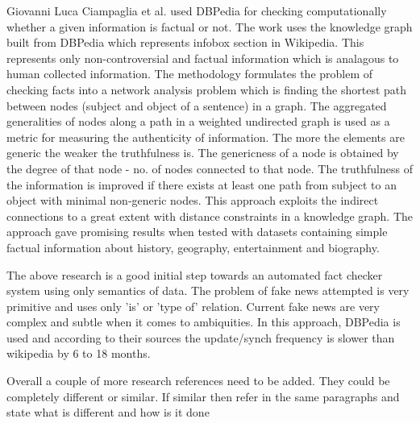 \documentclass[a4paper, 11pt]{article}
\begin{document}
Giovanni Luca Ciampaglia et al. used DBPedia for checking computationally whether a given information is factual or not. The work uses the knowledge graph built from DBPedia which represents infobox section in Wikipedia. This represents only non-controversial and factual information which is analagous to human collected information. The methodology formulates the problem of checking facts into a network analysis problem which is finding the shortest path between nodes (subject and object of a sentence) in a graph. The aggregated generalities of nodes along a path in a weighted undirected graph is used as a metric for measuring the authenticity of information. The more the elements are generic the weaker the truthfulness is.  The genericness of a node is obtained by the degree of that node - no. of nodes connected to that node. The truthfulness of the information is improved if there exists at least one path from subject to an object with minimal non-generic nodes. This approach exploits the indirect connections to a great extent with distance constraints in a knowledge graph. The approach gave promising results when tested with datasets containing simple factual information about history, geography, entertainment and biography\cite{Ciampaglia2015}. 

The above research is a good initial step towards an automated fact checker system using only semantics of data. The problem of fake news attempted is very primitive and uses only 'is' or 'type of' relation. Current fake news are very complex and subtle when it comes to ambiquities. In this approach, DBPedia is used and according to their sources the update/synch frequency is slower than wikipedia by 6 to 18 months.

\color{red}
Overall a couple of more research references need to be added. They could be completely different or similar. If similar then refer in the same paragraphs and state what is different and how is it done
\color{black}





\end{document}
